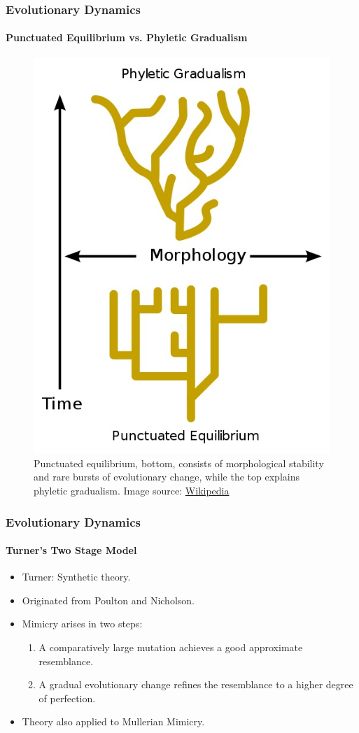\frame
{
	\frametitle{Evolutionary Dynamics}
	\framesubtitle{Punctuated Equilibrium vs. Phyletic Gradualism}

	\begin{figure}[H]
		\centering
		\includegraphics[scale=0.3]{../tex/images/Punctuated-equilibrium}
		\caption{Punctuated equilibrium, bottom, consists of morphological stability and rare bursts of evolutionary change, while the top explains phyletic gradualism. Image source: \href{http://en.wikipedia.org/wiki/Punctuated_equilibrium}{Wikipedia}}
		\label{fig:punctuated-equilibrium}
	\end{figure}
}

\frame
{
	\frametitle{Evolutionary Dynamics}
	\framesubtitle{Turner's Two Stage Model}

	\begin{itemize}
		\item Turner: Synthetic theory.
		\item Originated from Poulton and Nicholson.
		\item Mimicry arises in two steps:
			\begin{enumerate}
				\item A comparatively large mutation achieves a good approximate resemblance.
				\item A gradual evolutionary change refines the resemblance to a higher degree of perfection.
			\end{enumerate}
		\item Theory also applied to Mullerian Mimicry.
	\end{itemize}
}

